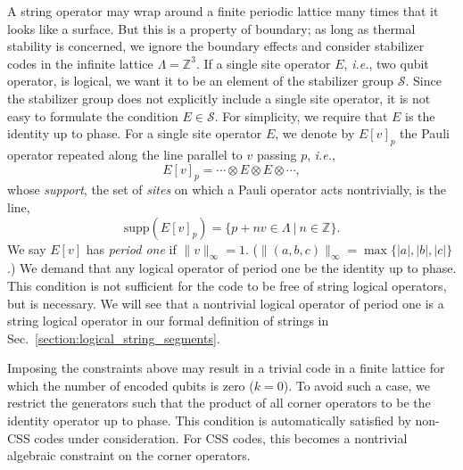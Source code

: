\documentclass[letterpaper,10pt,pra,aps,showpacs,twocolumn]{revtex4-1}
\theoremstyle{definition} \newtheorem{defn}{Definition}
\theoremstyle{definition} \newtheorem{remark}{Remark}
\newcommand{\supp}{\mathrm{supp}}
\newcommand{\ie}{\emph{i.e.}}
\begin{document}
A string operator may wrap around a finite periodic lattice many times that it looks like a surface. But this is a property of boundary; as long as thermal stability is concerned, we ignore the boundary effects and consider stabilizer codes in the infinite lattice $\Lambda = \mathbb{Z}^3$.
%
If a single site operator $E$, \ie, two qubit operator, is logical, we want it to be an element of the stabilizer group $\mathcal{S}$. Since the stabilizer group does not explicitly include a single site operator, it is not easy to formulate the condition $E \in \mathcal{S}$. For simplicity, we require that $E$ is the identity up to phase.
%
For a single site operator $E$, we denote by $E[v]_p$ the Pauli operator repeated along the line parallel to $v$ passing $p$, \ie,
\begin{equation}
E[v]_p = \cdots \otimes E \otimes E \otimes \cdots,
\end{equation}
whose \emph{support}, the set of \emph{sites} on which a Pauli operator acts nontrivially, is the line,
\[
\supp (E[v]_p) = \{ p + n v \in \Lambda ~|~ n \in \mathbb{Z} \} .
\]
We say $E[v]$ has \emph{period one} if $\| v \|_\infty = 1$. ($\|(a,b,c)\|_\infty = \max\{ |a|, |b|, |c| \}$.) We demand that any logical operator of period one be the identity up to phase. This condition is not sufficient for the code to be free of string logical operators, but is necessary. We will see that a nontrivial logical operator of period one is a string logical operator in our formal definition of strings in Sec.~\ref{section:logical_string_segments}.

Imposing the constraints above may result in a trivial code in a finite lattice for which the number of encoded qubits is zero ($k=0$). To avoid such a case, we restrict the generators such that the product of all corner operators to be the identity operator up to phase. This condition is automatically satisfied by non-CSS codes under consideration. For CSS codes, this becomes a nontrivial algebraic constraint on the corner operators.
\end{document}
